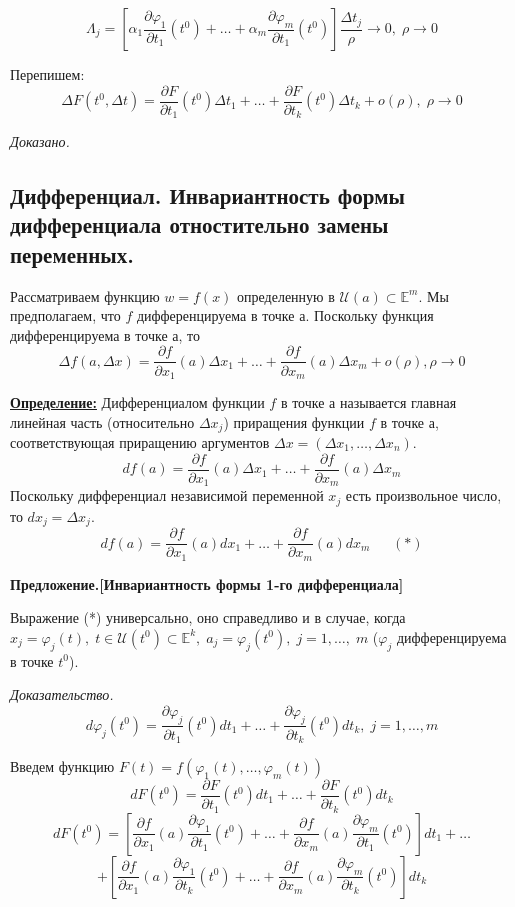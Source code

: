 \documentclass[a4paper,12pt]{article} %
\begin{document}
	\[\Lambda_j = [\alpha_1\frac{\partial \varphi_1}{\partial t_1}(t^0) + \ldots + \alpha_m \frac{\partial \varphi_m}{\partial t_1}(t^0)]\frac{\Delta t_j}{\rho} \to 0, \; \rho \to 0\]
	
	Перепишем:
	\[\Delta F(t^0, \Delta t) = \frac{\partial F}{\partial t_1}(t^0)\Delta t_1 + \ldots + \frac{\partial F}{\partial t_k}(t^0)\Delta t_k + o(\rho), \; \rho \to 0\]
	
	\textit{Доказано.}
	
	\subsection{Дифференциал. Инвариантность формы дифференциала отностительно замены переменных.}
	
	Рассматриваем функцию $w = f(x)$ определенную в $\mathscr{U}(a) \subset \mathds{E}^m$. Мы предполагаем, что $f$ дифференцируема в точке а. Поскольку функция дифференцируема в точке а, то \[\Delta f(a, \Delta x) = \frac{\partial f}{\partial x_1}(a)\Delta x_1 + \ldots + \frac{\partial f}{\partial x_m}(a) \Delta x_m + o(\rho), \rho \to 0\]
	
	\underline{\textbf{Определение:}} Дифференциалом функции $f$ в точке а называется главная линейная часть (относительно $\Delta x_j$) приращения функции $f$ в точке а, соответствующая приращению аргументов $\Delta x = (\Delta x_1, \ldots, \Delta x_n)$.
	\[df(a) = \frac{\partial f}{\partial x_1}(a)\Delta x_1 + \ldots + \frac{\partial f}{\partial x_m}(a)\Delta x_m\]
	Поскольку дифференциал независимой переменной $x_j$ есть произвольное число, то $dx_j = \Delta x_j$.
	\[df(a) = \frac{\partial f}{\partial x_1}(a)dx_1 + \ldots + \frac{\partial f}{\partial x_m}(a)dx_m ~~~~~~~(*)\]
	
	\textbf{Предложение.[Инвариантность формы 1-го дифференциала]} 
	
	Выражение (*) универсально, оно справедливо и в случае, когда $x_j = \varphi_j(t), \; t \in \mathscr{U}(t^0) \subset \mathds{E}^k, \; a_j = \varphi_j(t^0), \; j = 1, \ldots, \; m$ ($\varphi_j$ дифференцируема в точке $t^0$).
	
	\textit{Доказательство.}
	\[d\varphi_j(t^0) = \frac {\partial \varphi_j}{\partial t_1}(t^0)dt_1 + \ldots + \frac {\partial \varphi_j}{\partial t_k}(t^0)dt_k, \; j = 1, \ldots, m\]
	
	Введем функцию $F(t) = f(\varphi_1(t), \ldots, \varphi_m(t))$
	\[dF(t^0) = \frac{\partial F}{\partial t_1}(t^0)dt_1 + \ldots +\frac{\partial F}{\partial t_k}(t^0)dt_k \]
	\[dF(t^0) = \left[\frac{\partial f}{\partial x_1}(a) \frac{\partial \varphi_1}{\partial t_1}(t^0) + \ldots + \frac{\partial f}{\partial x_m}(a) \frac{\partial \varphi_m}{\partial t_1}(t^0) \right]dt_1 + \ldots\]
	\[+ \left[\frac{\partial f}{\partial x_1}(a) \frac{\partial \varphi_1}{\partial t_k}(t^0) + \ldots + \frac{\partial f}{\partial x_m}(a) \frac{\partial \varphi_m}{\partial t_k}(t^0) \right] dt_k\]
	
\end{document}
